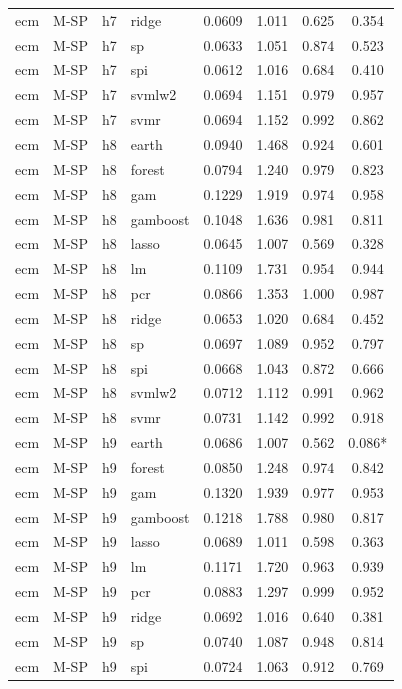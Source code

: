 \begin{ThreePartTable}
\begin{longtable}[t]{llclcccc}
ecm & M-SP & h7 & ridge & 0.0609 & 1.011 & 0.625 & 0.354\\
ecm & M-SP & h7 & sp & 0.0633 & 1.051 & 0.874 & 0.523\\
ecm & M-SP & h7 & spi & 0.0612 & 1.016 & 0.684 & 0.410\\
ecm & M-SP & h7 & svmlw2 & 0.0694 & 1.151 & 0.979 & 0.957\\
ecm & M-SP & h7 & svmr & 0.0694 & 1.152 & 0.992 & 0.862\\
\addlinespace
ecm & M-SP & h8 & earth & 0.0940 & 1.468 & 0.924 & 0.601\\
ecm & M-SP & h8 & forest & 0.0794 & 1.240 & 0.979 & 0.823\\
ecm & M-SP & h8 & gam & 0.1229 & 1.919 & 0.974 & 0.958\\
ecm & M-SP & h8 & gamboost & 0.1048 & 1.636 & 0.981 & 0.811\\
ecm & M-SP & h8 & lasso & 0.0645 & 1.007 & 0.569 & 0.328\\
ecm & M-SP & h8 & lm & 0.1109 & 1.731 & 0.954 & 0.944\\
ecm & M-SP & h8 & pcr & 0.0866 & 1.353 & 1.000 & 0.987\\
ecm & M-SP & h8 & ridge & 0.0653 & 1.020 & 0.684 & 0.452\\
ecm & M-SP & h8 & sp & 0.0697 & 1.089 & 0.952 & 0.797\\
ecm & M-SP & h8 & spi & 0.0668 & 1.043 & 0.872 & 0.666\\
ecm & M-SP & h8 & svmlw2 & 0.0712 & 1.112 & 0.991 & 0.962\\
ecm & M-SP & h8 & svmr & 0.0731 & 1.142 & 0.992 & 0.918\\
\addlinespace
ecm & M-SP & h9 & earth & 0.0686 & 1.007 & 0.562 & 0.086*\\
ecm & M-SP & h9 & forest & 0.0850 & 1.248 & 0.974 & 0.842\\
ecm & M-SP & h9 & gam & 0.1320 & 1.939 & 0.977 & 0.953\\
ecm & M-SP & h9 & gamboost & 0.1218 & 1.788 & 0.980 & 0.817\\
ecm & M-SP & h9 & lasso & 0.0689 & 1.011 & 0.598 & 0.363\\
ecm & M-SP & h9 & lm & 0.1171 & 1.720 & 0.963 & 0.939\\
ecm & M-SP & h9 & pcr & 0.0883 & 1.297 & 0.999 & 0.952\\
ecm & M-SP & h9 & ridge & 0.0692 & 1.016 & 0.640 & 0.381\\
ecm & M-SP & h9 & sp & 0.0740 & 1.087 & 0.948 & 0.814\\
ecm & M-SP & h9 & spi & 0.0724 & 1.063 & 0.912 & 0.769\\

\end{longtable}
\end{ThreePartTable}

